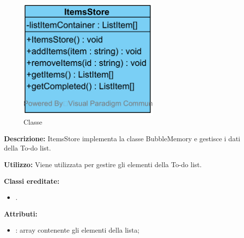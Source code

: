 \paragraph[::ItemsStore]{\class}\mbox{}\\ \label{\class}
\begin{figure}[H]
	\centering
	\includegraphics[width=7cm]{./diagrammi/todo/itemsstore.png}
	\caption{Classe \class}
\end{figure}
\textbf{Descrizione:}
ItemsStore implementa la classe BubbleMemory e gestisce i dati della To-do list.

\textbf{Utilizzo:}
Viene utilizzata per gestire gli elementi della To-do list.

\textbf{Classi ereditate:}
\begin{itemize}
	\item {}.
\end{itemize}

\textbf{Attributi:}
\begin{itemize}
	\item {}: array contenente gli elementi della lista;
\end{itemize}

